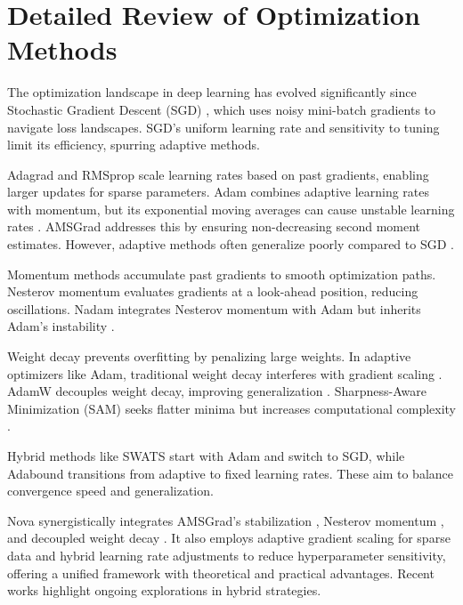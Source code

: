 \documentclass{article}
\begin{document}
\section{Detailed Review of Optimization Methods}\label{Sec 2}

The optimization landscape in deep learning has evolved significantly since Stochastic Gradient Descent (SGD) \cite{Robbins1951}, which uses noisy mini-batch gradients to navigate loss landscapes. SGD’s uniform learning rate and sensitivity to tuning limit its efficiency, spurring adaptive methods.

Adagrad \cite{Duchi2011} and RMSprop \cite{Tieleman2012} scale learning rates based on past gradients, enabling larger updates for sparse parameters. Adam \cite{kingma2014adam} combines adaptive learning rates with momentum, but its exponential moving averages can cause unstable learning rates \cite{Reddi2018}. AMSGrad \cite{Reddi2018} addresses this by ensuring non-decreasing second moment estimates. However, adaptive methods often generalize poorly compared to SGD \cite{Wilson2017}.

Momentum methods accumulate past gradients to smooth optimization paths. Nesterov momentum \cite{nesterov1983method} evaluates gradients at a look-ahead position, reducing oscillations. Nadam \cite{Dozat2016} integrates Nesterov momentum with Adam but inherits Adam’s instability \cite{Reddi2018}.

Weight decay prevents overfitting by penalizing large weights. In adaptive optimizers like Adam, traditional weight decay interferes with gradient scaling \cite{Loshchilov2017, B1}. AdamW \cite{Loshchilov2017} decouples weight decay, improving generalization \cite{Loshchilov2017, B2}. Sharpness-Aware Minimization (SAM) \cite{Foret2021} seeks flatter minima but increases computational complexity \cite{Foret2021, B3}.

Hybrid methods like SWATS \cite{Keskar2017} start with Adam and switch to SGD, while Adabound \cite{Luo2019} transitions from adaptive to fixed learning rates. These aim to balance convergence speed and generalization.

Nova synergistically integrates AMSGrad’s stabilization \cite{Reddi2018}, Nesterov momentum \cite{nesterov1983method}, and decoupled weight decay \cite{Loshchilov2017}. It also employs adaptive gradient scaling for sparse data \cite{Johnson2020} and hybrid learning rate adjustments to reduce hyperparameter sensitivity, offering a unified framework with theoretical and practical advantages. Recent works \cite{N1, N2, N3} highlight ongoing explorations in hybrid strategies.
\end{document}
